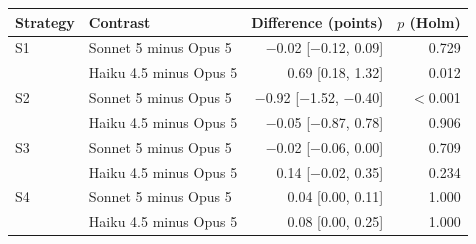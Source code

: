 \begin{tabular}{llrr}
\toprule
Strategy & Contrast & Difference (points) & $p$ (Holm) \\
\midrule
S1 & Sonnet 5 minus Opus 5 & $-$0.02 [$-$0.12, 0.09] & 0.729 \\
 & Haiku 4.5 minus Opus 5 & 0.69 [0.18, 1.32] & 0.012 \\
\midrule
S2 & Sonnet 5 minus Opus 5 & $-$0.92 [$-$1.52, $-$0.40] & $<$0.001 \\
 & Haiku 4.5 minus Opus 5 & $-$0.05 [$-$0.87, 0.78] & 0.906 \\
\midrule
S3 & Sonnet 5 minus Opus 5 & $-$0.02 [$-$0.06, 0.00] & 0.709 \\
 & Haiku 4.5 minus Opus 5 & 0.14 [$-$0.02, 0.35] & 0.234 \\
\midrule
S4 & Sonnet 5 minus Opus 5 & 0.04 [0.00, 0.11] & 1.000 \\
 & Haiku 4.5 minus Opus 5 & 0.08 [0.00, 0.25] & 1.000 \\
\bottomrule
\end{tabular}
